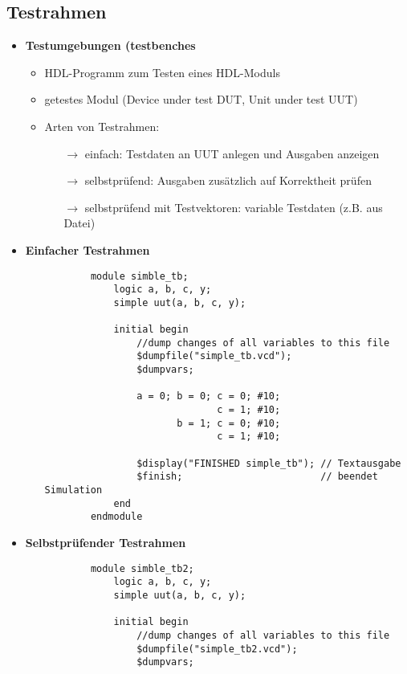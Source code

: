\subsection{Testrahmen}
\begin{itemize}

\item \textbf{Testumgebungen (testbenches}
	\begin{itemize}
	\item HDL-Programm zum Testen eines HDL-Moduls
	\item getestes Modul (Device under test DUT, Unit under test UUT)
	\item Arten von Testrahmen:
		\begin{itemize}
		\item[$\rightarrow$] einfach: Testdaten an UUT anlegen und Ausgaben anzeigen
		\item[$\rightarrow$] selbstprüfend: Ausgaben zusätzlich auf Korrektheit prüfen
		\item[$\rightarrow$] selbstprüfend mit Testvektoren: variable Testdaten (z.B. aus Datei)
		\end{itemize}
	\end{itemize}
	
\item \textbf{Einfacher Testrahmen}
	\begin{itemize}
	\item[]
		\begin{lstlisting}
		module simble_tb;
			logic a, b, c, y;
			simple uut(a, b, c, y);
			
			initial begin
				//dump changes of all variables to this file
				$dumpfile("simple_tb.vcd");
				$dumpvars;
				
				a = 0; b = 0; c = 0; #10;
							  c = 1; #10;
					   b = 1; c = 0; #10;
					   	      c = 1; #10;
					   	      
				$display("FINISHED simple_tb"); // Textausgabe
				$finish; 						// beendet Simulation
			end
		endmodule
		\end{lstlisting}
	\end{itemize}
	
\item \textbf{Selbstprüfender Testrahmen}
	\begin{itemize}
	\item[]
		\begin{lstlisting}
		module simble_tb2;
			logic a, b, c, y;
			simple uut(a, b, c, y);
			
			initial begin
				//dump changes of all variables to this file
				$dumpfile("simple_tb2.vcd");
				$dumpvars;
				

\end{lstlisting}
\end{itemize}
\end{itemize}

